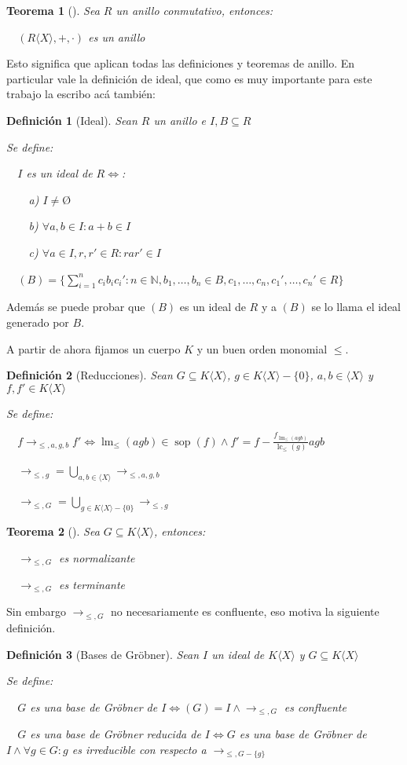 \documentclass{amsbook}
\theoremstyle{customstyle}
\newtheorem{definition}{Definición}[section]
\newtheorem{theorem}{Teorema}[section]
\newcommand{\definición}[2][]{
  \begin{definition}[#1]
  \setlength{\parindent}{2em} %
  #2
  \end{definition}
}
\newcommand{\teorema}[2][]{
  \begin{theorem}[#1]
  \setlength{\parindent}{2em} %
  #2
  \end{theorem}
}
\DeclareMathOperator{\sop}{sop}
\DeclareMathOperator{\lm}{lm}
\DeclareMathOperator{\lc}{lc}
\begin{document}
\teorema[]{
Sea $R$ un anillo conmutativo, entonces:

  $(R⟨X⟩, +, ·)$ es un anillo

}

Esto significa que aplican todas las definiciones y teoremas de anillo.
En particular vale la definición de ideal, que como es muy importante para este trabajo la escribo acá también:

\definición[Ideal] {
Sean $R$ un anillo e $I, B ⊆ R$

Se define:

  $I$ es un ideal de $R ⇔$:

    a) $I ≠ Ø$

    b) $∀a, b ∈ I : a + b ∈ I$

    c) $∀a ∈ I, r, r' ∈ R : rar' ∈ I$

  $(B) = \{\sum_{i = 1}^n c_i b_i c_i' : n ∈ ℕ, b_1, …, b_n ∈ B, c_1, …, c_n, c_1', …, c_n' ∈ R\}$
}

Además se puede probar que $(B)$ es un ideal de $R$ y a $(B)$ se lo llama el ideal generado por $B$.

A partir de ahora fijamos un cuerpo $K$ y un buen orden monomial $≤$.

\definición[Reducciones] {
Sean $G ⊆ K⟨X⟩$, $g ∈ K⟨X⟩ - \{0\}$, $a, b ∈ ⟨X⟩$ y $f, f' ∈ K⟨X⟩$

Se define:

  $f →_{≤, a, g, b} f' ⇔ \lm_≤(agb) ∈ \sop(f) ∧ f' = f - \frac{f_{\lm_≤(agb)}}{\lc_≤(g)}agb$

  $→_{≤, g} = \bigcup_{a, b ∈ ⟨X⟩} →_{≤, a, g, b}$

  $→_{≤, G} = \bigcup_{g ∈ K⟨X⟩ - \{0\}} →_{≤, g}$
}

\teorema[]{
Sea $G ⊆ K⟨X⟩$, entonces:

  $→_{≤, G}$ es normalizante

  $→_{≤, G}$ es terminante

}

Sin embargo $→_{≤, G}$ no necesariamente es confluente, eso motiva la siguiente definición.

\definición[Bases de Gröbner] {
Sean $I$ un ideal de $K⟨X⟩$ y $G ⊆ K⟨X⟩$

Se define:

  $G$ es una base de Gröbner de $I ⇔ (G) = I ∧ →_{≤, G}$ es confluente

  $G$ es una base de Gröbner reducida de $I ⇔ G$ es una base de Gröbner de $I ∧ ∀g ∈ G : g$ es irreducible con respecto a $→_{≤, G - \{g\}}$

}
\end{document}
